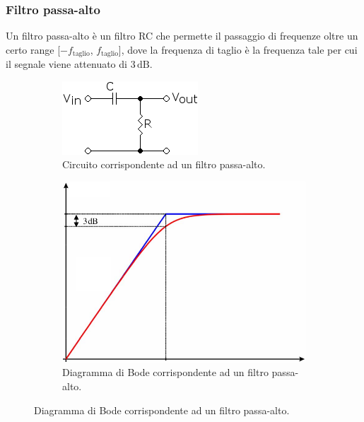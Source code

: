 \documentclass{article}
\begin{document}
			\subsubsection{Filtro passa-alto}
				Un filtro passa-alto è un filtro RC che permette il passaggio di frequenze oltre un certo range [$ -f_{\mathrm{taglio}} $, $ f_{\mathrm{taglio}} $], dove la frequenza di taglio è la frequenza tale per cui il segnale viene attenuato di $ 3 \, \mathrm{dB} $.
				\begin{figure}[h!]
					\centering
					\begin{subfigure}{0.4\textwidth}
						\centering
						\includegraphics[scale=0.6]{filtroPassaAlto}
						\caption{Circuito corrispondente ad un filtro passa-alto.}
					\end{subfigure}
					\begin{subfigure}{0.4\textwidth}
						\centering
						\includegraphics[scale=0.4]{filtroPassaAltoBode}
						\caption{Diagramma di Bode corrispondente ad un filtro passa-alto.}
					\end{subfigure}
					\label{fig:filtroPassaAlto}
				\end{figure}
				\newpage
\end{document}
